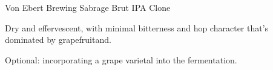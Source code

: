 \begin{recipe}{Von Ebert Brewing Sabrage Brut IPA Clone}

\begin{aboutblock}
Dry and effervescent, with minimal bitterness and hop character that's dominated
by grapefruitand. \sourceaha
\end{aboutblock}


\begin{methodandtiming}
 
\begin{mashsteps}
\end{mashsteps}

\begin{fermentationsteps}
\end{fermentationsteps}

\begin{directions}
Optional: incorporating a grape varietal into the fermentation.
\end{directions}

\end{methodandtiming}

\recipebreak

\begin{ingredientsblock}

\begin{malts}
\end{malts}

\begin{hops}
\end{hops}


\end{ingredientsblock}

\end{recipe}

